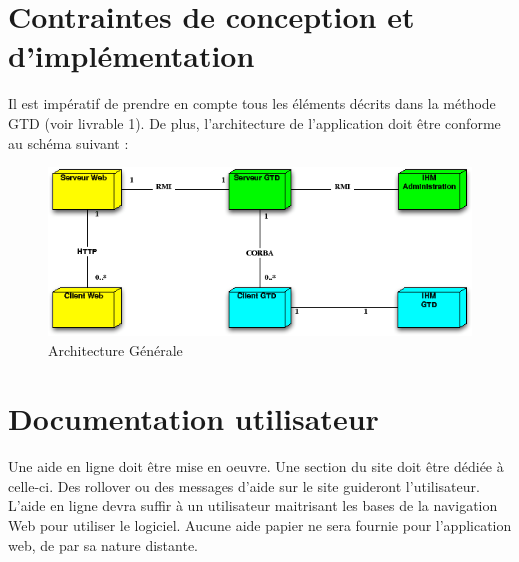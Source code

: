 	\section{Contraintes de conception et d'implémentation}
Il est impératif de prendre en compte tous les éléments décrits dans la méthode GTD (voir livrable 1). De plus, l'architecture de l'application doit être conforme au schéma suivant : \\

  \begin{figure}[H]
  \begin{center}
  \includegraphics[scale=1]{diagrams/archi.png}
  \caption{Architecture Générale}
  \label{fig:Architecture Generale}
  \end{center}
  \end{figure}



	\section{Documentation utilisateur}
Une aide en ligne doit être mise en oeuvre. Une section du site doit être dédiée à celle-ci. Des rollover ou des messages d'aide sur le site guideront l'utilisateur. L'aide en ligne devra  suffir à un utilisateur maitrisant les bases de la navigation Web pour utiliser le logiciel. Aucune aide papier ne sera fournie pour l'application web, de par sa nature distante.


